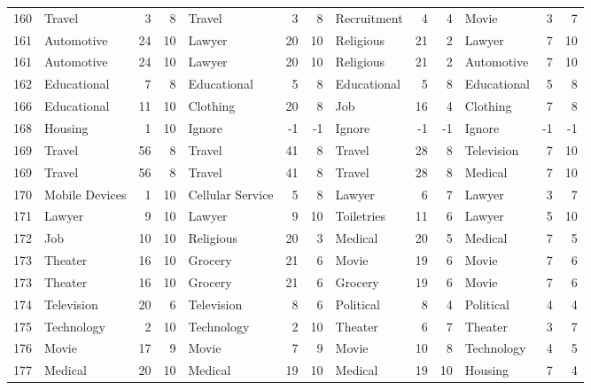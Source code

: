 \begin{figure}[htbp]
\begin{tabular}{rlrrlrrlrrlrr}
    160   & Travel & 3     & 8     & Travel & 3     & 8     & Recruitment & 4     & 4     & Movie & 3     & 7 \\
    161   & Automotive & 24    & 10    & Lawyer & 20    & 10    & Religious & 21    & 2     & Lawyer & 7     & 10 \\
    161   & Automotive & 24    & 10    & Lawyer & 20    & 10    & Religious & 21    & 2     & Automotive & 7     & 10 \\
    162   & Educational & 7     & 8     & Educational & 5     & 8     & Educational & 5     & 8     & Educational & 5     & 8 \\
    166   & Educational & 11    & 10    & Clothing & 20    & 8     & Job   & 16    & 4     & Clothing & 7     & 8 \\
    168   & Housing & 1     & 10    & Ignore & -1    & -1    & Ignore & -1    & -1    & Ignore & -1    & -1 \\
    169   & Travel & 56    & 8     & Travel & 41    & 8     & Travel & 28    & 8     & Television & 7     & 10 \\
    169   & Travel & 56    & 8     & Travel & 41    & 8     & Travel & 28    & 8     & Medical & 7     & 10 \\
    170   & Mobile Devices & 1     & 10    & Cellular Service & 5     & 8     & Lawyer & 6     & 7     & Lawyer & 3     & 7 \\
    171   & Lawyer & 9     & 10    & Lawyer & 9     & 10    & Toiletries & 11    & 6     & Lawyer & 5     & 10 \\
    172   & Job   & 10    & 10    & Religious & 20    & 3     & Medical & 20    & 5     & Medical & 7     & 5 \\
    173   & Theater & 16    & 10    & Grocery & 21    & 6     & Movie & 19    & 6     & Movie & 7     & 6 \\
    173   & Theater & 16    & 10    & Grocery & 21    & 6     & Grocery & 19    & 6     & Movie & 7     & 6 \\
    174   & Television & 20    & 6     & Television & 8     & 6     & Political & 8     & 4     & Political & 4     & 4 \\
    175   & Technology & 2     & 10    & Technology & 2     & 10    & Theater & 6     & 7     & Theater & 3     & 7 \\
    176   & Movie & 17    & 9     & Movie & 7     & 9     & Movie & 10    & 8     & Technology & 4     & 5 \\
    177   & Medical & 20    & 10    & Medical & 19    & 10    & Medical & 19    & 10    & Housing & 7     & 4 \\

\end{tabular}
\end{figure}
